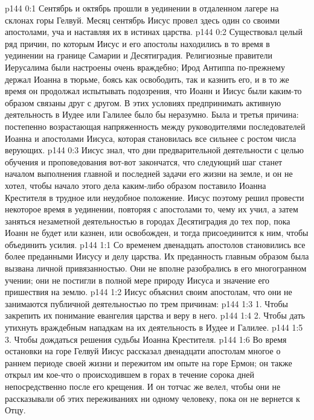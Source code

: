 \author{Комиссия срединников}
\vs p144 0:1 Сентябрь и октябрь прошли в уединении в отдаленном лагере на склонах горы Гелвуй. Месяц сентябрь Иисус провел здесь один со своими апостолами, уча и наставляя их в истинах царства.
\vs p144 0:2 Существовал целый ряд причин, по которым Иисус и его апостолы находились в то время в уединении на границе Самарии и Десятиградия. Религиозные правители Иерусалима были настроены очень враждебно; Ирод Антиппа по\hyp{}прежнему держал Иоанна в тюрьме, боясь как освободить, так и казнить его, и в то же время он продолжал испытывать подозрения, что Иоанн и Иисус были каким\hyp{}то образом связаны друг с другом. В этих условиях предпринимать активную деятельность в Иудее или Галилее было бы неразумно. Была и третья причина: постепенно возрастающая напряженность между руководителями последователей Иоанна и апостолами Иисуса, которая становилась все сильнее с ростом числа верующих.
\vs p144 0:3 Иисус знал, что дни предварительной деятельности с целью обучения и проповедования вот\hyp{}вот закончатся, что следующий шаг станет началом выполнения главной и последней задачи его жизни на земле, и он не хотел, чтобы начало этого дела каким\hyp{}либо образом поставило Иоанна Крестителя в трудное или неудобное положение. Иисус поэтому решил провести некоторое время в уединении, повторяя с апостолами то, чему их учил, а затем заняться незаметной деятельностью в городах Десятиградия до тех пор, пока Иоанн не будет или казнен, или освобожден, и тогда присоединится к ним, чтобы объединить усилия.
\vs p144 1:1 Со временем двенадцать апостолов становились все более преданными Иисусу и делу царства. Их преданность главным образом была вызвана личной привязанностью. Они не вполне разобрались в его многогранном учении; они не постигли в полной мере природу Иисуса и значение его пришествия на землю.
\vs p144 1:2 Иисус объяснил своим апостолам, что они не занимаются публичной деятельностью по трем причинам:
\vs p144 1:3 1. Чтобы закрепить их понимание евангелия царства и веру в него.
\vs p144 1:4 2. Чтобы дать утихнуть враждебным нападкам на их деятельность в Иудее и Галилее.
\vs p144 1:5 3. Чтобы дождаться решения судьбы Иоанна Крестителя.
\vs p144 1:6 Во время остановки на горе Гелвуй Иисус рассказал двенадцати апостолам многое о раннем периоде своей жизни и пережитом им опыте на горе Ермон; он также открыл им кое\hyp{}что о происходившем в горах в течение сорока дней непосредственно после его крещения. И он тотчас же велел, чтобы они не рассказывали об этих переживаниях ни одному человеку, пока он не вернется к Отцу.
